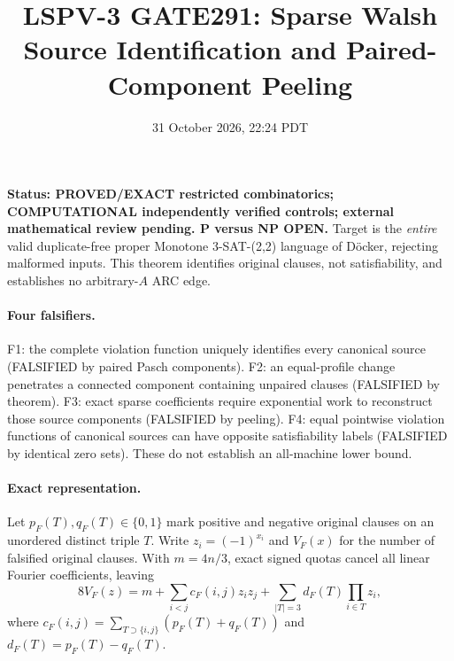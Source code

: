 \documentclass[11pt]{article}
\title{LSPV-3 GATE291: Sparse Walsh Source Identification and Paired-Component Peeling}
\date{31 October 2026, 22:24 PDT}
\begin{document}
\maketitle
\noindent\textbf{Status: PROVED/EXACT restricted combinatorics; COMPUTATIONAL independently verified controls; external mathematical review pending. P versus NP OPEN.} Target is the \emph{entire} valid duplicate-free proper Monotone 3-SAT-(2,2) language of D\"ocker, rejecting malformed inputs. This theorem identifies original clauses, not satisfiability, and establishes no arbitrary-$A$ ARC edge.

\paragraph{Four falsifiers.} F1: the complete violation function uniquely identifies every canonical source (FALSIFIED by paired Pasch components). F2: an equal-profile change penetrates a connected component containing unpaired clauses (FALSIFIED by theorem). F3: exact sparse coefficients require exponential work to reconstruct those source components (FALSIFIED by peeling). F4: equal pointwise violation functions of canonical sources can have opposite satisfiability labels (FALSIFIED by identical zero sets). These do not establish an all-machine lower bound.

\paragraph{Exact representation.} Let $p_F(T),q_F(T)\in\{0,1\}$ mark positive and negative original clauses on an unordered distinct triple $T$. Write $z_i=(-1)^{x_i}$ and $V_F(x)$ for the number of falsified original clauses. With $m=4n/3$, exact signed quotas cancel all linear Fourier coefficients, leaving
\[
8V_F(z)=m+\sum_{i<j}c_F(i,j)z_iz_j+
\sum_{|T|=3}d_F(T)\prod_{i\in T}z_i,
\]
where $c_F(i,j)=\sum_{T\supset\{i,j\}}(p_F(T)+q_F(T))$ and $d_F(T)=p_F(T)-q_F(T)$.
\end{document}
